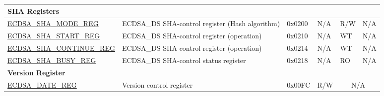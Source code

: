 \begin{longtable}{ | p{4.6cm} | l | p{1.2cm} | l | l | l | l | }
\multicolumn{7}{|l|}{\textbf{SHA Registers}} \\ \hline
\hyperref[regdesc:ECDSASHAMODEREG]{ECDSA\_SHA\_MODE\_REG} & ECDSA\_DS SHA-control register (Hash algorithm) & 0x0200 & N/A & R/W & \multicolumn{2}{|c|}{N/A} \\ \hline
\hyperref[regdesc:ECDSASHASTARTREG]{ECDSA\_SHA\_START\_REG} & ECDSA\_DS SHA-control register (operation) & 0x0210 & N/A & WT & \multicolumn{2}{|c|}{N/A} \\ \hline
\hyperref[regdesc:ECDSASHACONTINUEREG]{ECDSA\_SHA\_CONTINUE\_REG} & ECDSA\_DS SHA-control register (operation) & 0x0214 & N/A & WT & \multicolumn{2}{|c|}{N/A} \\ \hline
\hyperref[regdesc:ECDSASHABUSYREG]{ECDSA\_SHA\_BUSY\_REG} & ECDSA\_DS SHA-control status register & 0x0218 & N/A & RO & \multicolumn{2}{|c|}{N/A} \\ \hline
\multicolumn{7}{|l|}{\textbf{Version Register}} \\ \hline
\hyperref[regdesc:ECDSADATEREG]{ECDSA\_DATE\_REG} & Version control register & 0x00FC & R/W & \multicolumn{3}{|c|}{N/A} \\ \hline
\end{longtable}
